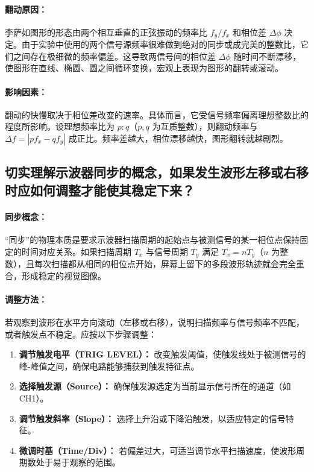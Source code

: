 \documentclass[]{../../templates/Report}%
\begin{document}
\paragraph{翻动原因：} 李萨如图形的形态由两个相互垂直的正弦振动的频率比 $f_y/f_x$ 和相位差 $\Delta\phi$ 决定。由于实验中使用的两个信号源频率很难做到绝对的同步或成完美的整数比，它们之间存在极细微的频率偏差。这导致两信号间的相位差 $\Delta\phi$ 随时间不断漂移，使图形在直线、椭圆、圆之间循环变换，宏观上表现为图形的翻转或滚动。

\paragraph{影响因素：} 翻动的快慢取决于相位差改变的速率。具体而言，它受信号频率偏离理想整数比的程度所影响。设理想频率比为 $p:q$（$p, q$ 为互质整数），则翻动频率与 $\Delta f = |p f_x - q f_y|$ 成正比。频率差越大，相位漂移越快，图形翻转就越剧烈。

\subsection{切实理解示波器同步的概念，如果发生波形左移或右移时应如何调整才能使其稳定下来？}

\paragraph{同步概念：} “同步”的物理本质是要求示波器扫描周期的起始点与被测信号的某一相位点保持固定的时间对应关系。如果扫描周期 $T_x$ 与信号周期 $T_y$ 满足 $T_x = n T_y$（$n$ 为整数），且每次扫描都从相同的相位点开始，屏幕上留下的多段波形轨迹就会完全重合，形成稳定的视觉图像。

\paragraph{调整方法：} 若观察到波形在水平方向滚动（左移或右移），说明扫描频率与信号频率不匹配，或者触发点不稳定。应按以下步骤调整：
\begin{enumerate}
    \item \textbf{调节触发电平（TRIG LEVEL）：} 改变触发阈值，使触发线处于被测信号的峰-峰值之间，确保电路能够捕获到触发特征点。
    \item \textbf{选择触发源（Source）：} 确保触发源选定为当前显示信号所在的通道（如 CH1）。
    \item \textbf{调节触发斜率（Slope）：} 选择上升沿或下降沿触发，以适应特定的信号特征。
    \item \textbf{微调时基（Time/Div）：} 若偏差过大，可适当调节水平扫描速度，使波形周期数处于易于观察的范围。
\end{enumerate}
\end{document}
